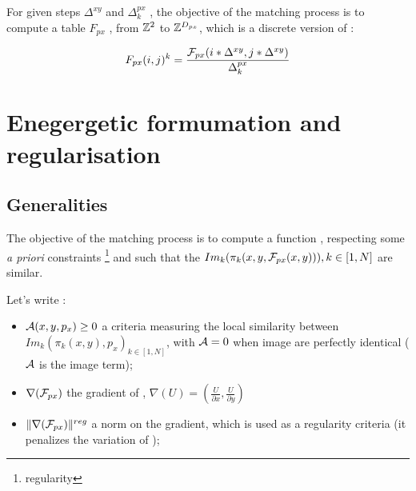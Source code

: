 For given steps   $\Delta^{xy}$ and $\Delta^{px}_k$ , the objective of
the matching process is to compute a table $F_{px}$ , from $\ZZ^2$  to
$\ZZ^{\DimPx}$, which is a discrete version of \FPx:


\begin{equation}
   F_{px}(i,j)^k = \frac{\FPx(i*\Delta^{xy},j*\Delta^{xy})}{\Delta^{px}_k}
\end{equation}





\section{Enegergetic formumation and regularisation}

\subsection{Generalities}

\label{AM:Appr:Energ}


The objective of the matching process is to compute a function
\FPx , respecting some \emph{a priori} constraints \footnote{regularity}
and such that the $Im_k(\pi_k(x,y,\FPx(x,y))),k\in [1,N]$ are similar.



Let's write :

\begin{itemize}
     \item $\Ress(x,y,p_x) \geq 0$  a criteria measuring the
            local similarity between 
            $Im_k(\pi_k(x,y),p_x)_{k\in [1,N]}$, with $\Ress=0$
            when image are perfectly identical ($\Ress$ is the image term);

      \item $\nabla(\FPx)$ the gradient of \FPx, 
             $\nabla(U) = (\frac{U}{\partial x}, \frac{U}{\partial y})$

      \item $\| \nabla(\FPx) \|^{reg}$ a norm on the gradient, which is used as
            a regularity criteria (it penalizes the variation of \FPx);
\end{itemize}


